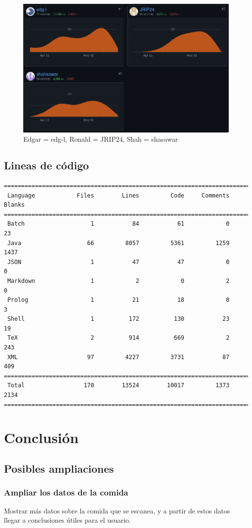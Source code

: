 \documentclass[12pt,a4paper]{article}
\begin{document}
\begin{figure}[h]
 	\centering
	\includegraphics[width=\textwidth]{git-contributors}
	\caption{Edgar = edg-l, Ronald = JRIP24, Shah = shasawar}
\end{figure}

\subsection{Lineas de código}

\begin{verbatim}
===============================================================================
 Language            Files        Lines         Code     Comments       Blanks
===============================================================================
 Batch                   1           84           61            0           23
 Java                   66         8057         5361         1259         1437
 JSON                    1           47           47            0            0
 Markdown                1            2            0            2            0
 Prolog                  1           21           18            0            3
 Shell                   1          172          130           23           19
 TeX                     2          914          669            2          243
 XML                    97         4227         3731           87          409
===============================================================================
 Total                 170        13524        10017         1373         2134
===============================================================================
\end{verbatim}

\newpage

\section{Conclusión}

\subsection{Posibles ampliaciones}

\subsubsection{Ampliar los datos de la comida}
Mostrar más datos sobre la comida que se escanea, y a partir de estos datos llegar a conclusiones útiles para el usuario.
\end{document}
